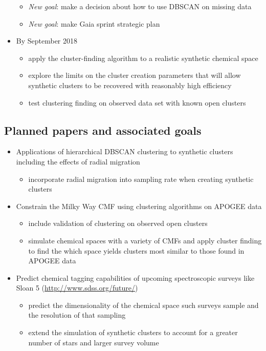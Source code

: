 \documentclass[11pt]{article}
\begin{document}
\begin{itemize}
\begin{itemize}
\item \emph{New goal}: {\color{ForestGreen} make a decision about how to use DBSCAN on missing data}
\item \emph{New goal}: {\color{RoyalBlue} make Gaia sprint strategic plan}
\end{itemize}
\item By September 2018
\begin{itemize}
\item {\color{RoyalBlue}apply the cluster-finding algorithm to a realistic synthetic chemical space} 
\item {\color{ForestGreen} explore the limits on the cluster creation parameters that will allow synthetic clusters to be recovered with reasonably high efficiency}
\item test clustering finding on observed data set with known open clusters
\end{itemize}
\end{itemize}

\subsection*{Planned papers and associated goals}
\begin{itemize}
	\item Applications of hierarchical DBSCAN clustering to synthetic clusters including the effects of radial migration
	\begin{itemize}
	\item incorporate radial migration into sampling rate when creating synthetic clusters
	\end{itemize}
	\item Constrain the Milky Way CMF using clustering algorithms on APOGEE data
	\begin{itemize}
	\item include validation of clustering on observed open clusters
	\item simulate chemical spaces with a variety of CMFs and apply cluster finding to find the which space yields clusters most similar to those found in APOGEE data
	\end{itemize}
	\item Predict chemical tagging capabilities of upcoming spectroscopic surveys like Sloan 5 (\url{http://www.sdss.org/future/})
	\begin{itemize}
	\item predict the dimensionality of the chemical space such surveys sample and the resolution of that sampling
	\item extend the simulation of synthetic clusters to account for a greater number of stars and larger survey volume
	\end{itemize}
\end{itemize}

\end{document}
